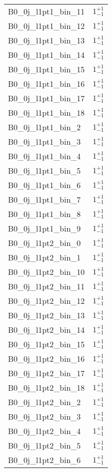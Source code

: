 \begin{tabular}{|l|c|}
B0\_0j\_l1pt1\_bin\_11 & $1^{+1}_{-1}$ \\
B0\_0j\_l1pt1\_bin\_12 & $1^{+1}_{-1}$ \\
B0\_0j\_l1pt1\_bin\_13 & $1^{+1}_{-1}$ \\
B0\_0j\_l1pt1\_bin\_14 & $1^{+1}_{-1}$ \\
B0\_0j\_l1pt1\_bin\_15 & $1^{+1}_{-1}$ \\
B0\_0j\_l1pt1\_bin\_16 & $1^{+1}_{-1}$ \\
B0\_0j\_l1pt1\_bin\_17 & $1^{+1}_{-1}$ \\
B0\_0j\_l1pt1\_bin\_18 & $1^{+1}_{-1}$ \\
B0\_0j\_l1pt1\_bin\_2 & $1^{+1}_{-1}$ \\
B0\_0j\_l1pt1\_bin\_3 & $1^{+1}_{-1}$ \\
B0\_0j\_l1pt1\_bin\_4 & $1^{+1}_{-1}$ \\
B0\_0j\_l1pt1\_bin\_5 & $1^{+1}_{-1}$ \\
B0\_0j\_l1pt1\_bin\_6 & $1^{+1}_{-1}$ \\
B0\_0j\_l1pt1\_bin\_7 & $1^{+1}_{-1}$ \\
B0\_0j\_l1pt1\_bin\_8 & $1^{+1}_{-1}$ \\
B0\_0j\_l1pt1\_bin\_9 & $1^{+1}_{-1}$ \\
B0\_0j\_l1pt2\_bin\_0 & $1^{+1}_{-1}$ \\
B0\_0j\_l1pt2\_bin\_1 & $1^{+1}_{-1}$ \\
B0\_0j\_l1pt2\_bin\_10 & $1^{+1}_{-1}$ \\
B0\_0j\_l1pt2\_bin\_11 & $1^{+1}_{-1}$ \\
B0\_0j\_l1pt2\_bin\_12 & $1^{+1}_{-1}$ \\
B0\_0j\_l1pt2\_bin\_13 & $1^{+1}_{-1}$ \\
B0\_0j\_l1pt2\_bin\_14 & $1^{+1}_{-1}$ \\
B0\_0j\_l1pt2\_bin\_15 & $1^{+1}_{-1}$ \\
B0\_0j\_l1pt2\_bin\_16 & $1^{+1}_{-1}$ \\
B0\_0j\_l1pt2\_bin\_17 & $1^{+1}_{-1}$ \\
B0\_0j\_l1pt2\_bin\_18 & $1^{+1}_{-1}$ \\
B0\_0j\_l1pt2\_bin\_2 & $1^{+1}_{-1}$ \\
B0\_0j\_l1pt2\_bin\_3 & $1^{+1}_{-1}$ \\
B0\_0j\_l1pt2\_bin\_4 & $1^{+1}_{-1}$ \\
B0\_0j\_l1pt2\_bin\_5 & $1^{+1}_{-1}$ \\
B0\_0j\_l1pt2\_bin\_6 & $1^{+1}_{-1}$ \\

\end{tabular}
